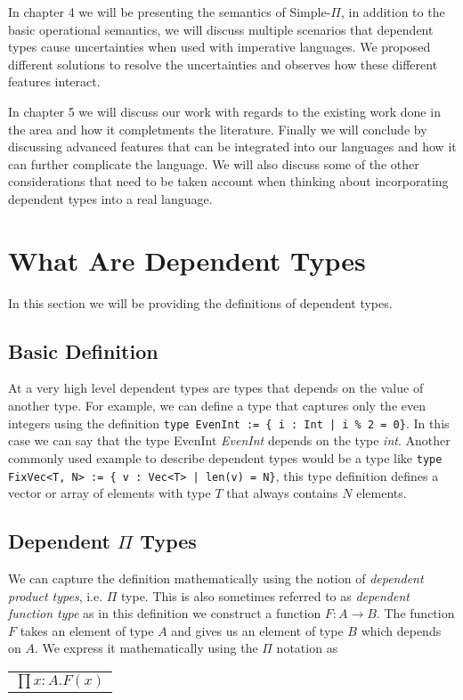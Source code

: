 \documentclass[a4paper,12pt]{report}
\begin{document}
\par
In chapter 4 we will be presenting the semantics of Simple-$\Pi$, in addition 
to the basic operational semantics, we will discuss
multiple scenarios that dependent types cause uncertainties when used with 
imperative languages. We proposed different solutions to resolve the 
uncertainties and observes how these different features interact. 

\par
In chapter 5 we will discuss our work with regards to the 
existing work done in the area and how it completments the literature. 
Finally we will conclude by discussing advanced features that can be integrated 
into our languages and how it can further complicate the language. We will also 
discuss some of the other considerations that need to be taken account when 
thinking about incorporating dependent types into a real language. 

\section{What Are Dependent Types}
In this section we will be providing the definitions of dependent types.

\subsection{Basic Definition}
At a very high level dependent types are types that depends on the value of 
another type. For example, we can define a type that captures only the even 
integers using the definition 
\verb+type EvenInt := { i : Int | i % 2 = 0}+. In this case we 
can say that the type EvenInt \textit{EvenInt} depends on the type \textit{int}.
Another commonly used example to describe dependent types would be a type like 
\verb+type FixVec<T, N> := { v : Vec<T> | len(v) = N}+, this type definition defines 
a vector or array of elements with type $T$ that always contains $N$ elements.

\subsection{Dependent $\Pi$ Types}
We can capture the definition mathematically using the notion of \textit{dependent 
product types}, i.e. $\Pi$ type. This is also sometimes referred to as 
\textit{dependent function type} as in this definition we construct a function 
$F: A \rightarrow B$. The function $F$ takes an element of type $A$ and 
gives us an element of type $B$ which depends on $A$. We express it 
mathematically using the $\Pi$ notation as
\begin{center}
 \begin{tabular}{l}
   $\prod x: A.  F(x)$
 \end{tabular} 
\end{center}
\end{document}
